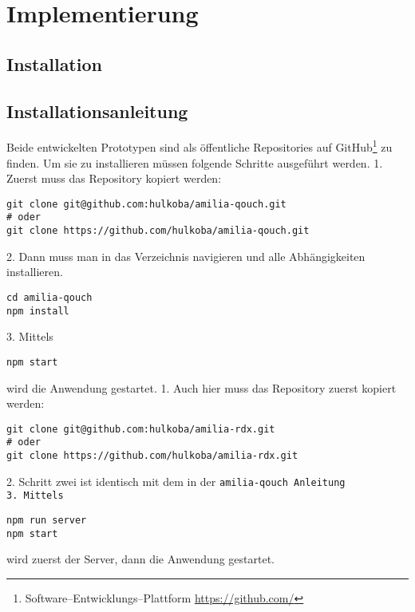 \chapter{\label{chap:implementierung}Implementierung}
\section{Installation}
\section{Installationsanleitung}
Beide entwickelten Prototypen sind als öffentliche Repositories auf GitHub\footnote{Software--Entwicklungs--Plattform \url{https://github.com/}} zu finden. 
Um sie zu installieren müssen folgende Schritte ausgeführt werden.
1. Zuerst muss das Repository kopiert werden:
\begin{lstlisting}
git clone git@github.com:hulkoba/amilia-qouch.git
# oder
git clone https://github.com/hulkoba/amilia-qouch.git
\end{lstlisting}
2. Dann muss man in das Verzeichnis navigieren und alle Abhängigkeiten installieren.
\begin{lstlisting}
cd amilia-qouch
npm install
\end{lstlisting}
3. Mittels
\begin{lstlisting}
npm start
\end{lstlisting}
wird die Anwendung gestartet.
%
1. Auch hier muss das Repository zuerst kopiert werden:
\begin{lstlisting}
git clone git@github.com:hulkoba/amilia-rdx.git
# oder
git clone https://github.com/hulkoba/amilia-rdx.git
\end{lstlisting}
2. Schritt zwei ist identisch mit dem in der \tt{amilia-qouch} Anleitung\\
3. Mittels
\begin{lstlisting}
npm run server
npm start
\end{lstlisting}
wird zuerst der Server, dann die Anwendung gestartet.